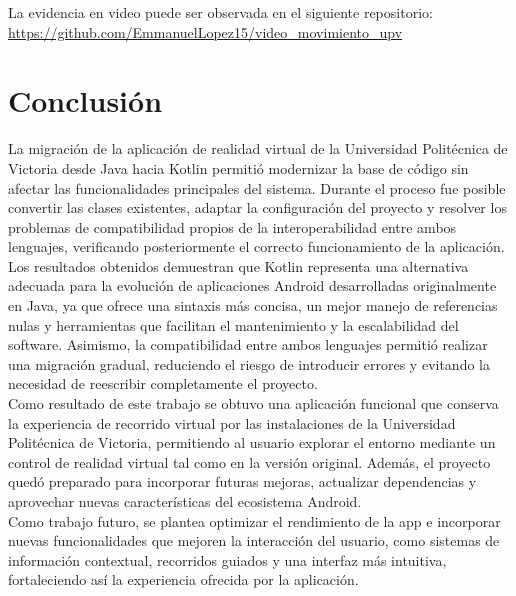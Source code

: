 \documentclass[conference]{IEEEtran}
\begin{document}
La evidencia en video puede ser observada en el siguiente repositorio:\\

\url{https://github.com/EmmanuelLopez15/video_movimiento_upv} 

\section{Conclusión}

La migración de la aplicación de realidad virtual de la Universidad Politécnica de Victoria desde Java hacia Kotlin permitió modernizar la base de código sin afectar las funcionalidades principales del sistema. Durante el proceso fue posible convertir las clases existentes, adaptar la configuración del proyecto y resolver los problemas de compatibilidad propios de la interoperabilidad entre ambos lenguajes, verificando posteriormente el correcto funcionamiento de la aplicación.\\

Los resultados obtenidos demuestran que Kotlin representa una alternativa adecuada para la evolución de aplicaciones Android desarrolladas originalmente en Java, ya que ofrece una sintaxis más concisa, un mejor manejo de referencias nulas y herramientas que facilitan el mantenimiento y la escalabilidad del software. Asimismo, la compatibilidad entre ambos lenguajes permitió realizar una migración gradual, reduciendo el riesgo de introducir errores y evitando la necesidad de reescribir completamente el proyecto.\\

Como resultado de este trabajo se obtuvo una aplicación funcional que conserva la experiencia de recorrido virtual por las instalaciones de la Universidad Politécnica de Victoria, permitiendo al usuario explorar el entorno mediante un control de realidad virtual tal como en la versión original. Además, el proyecto quedó preparado para incorporar futuras mejoras, actualizar dependencias y aprovechar nuevas características del ecosistema Android.\\

Como trabajo futuro, se plantea optimizar el rendimiento de la app e incorporar nuevas funcionalidades que mejoren la interacción del usuario, como sistemas de información contextual, recorridos guiados y una interfaz más intuitiva, fortaleciendo así la experiencia ofrecida por la aplicación.\\

\printbibliography
\end{document}
